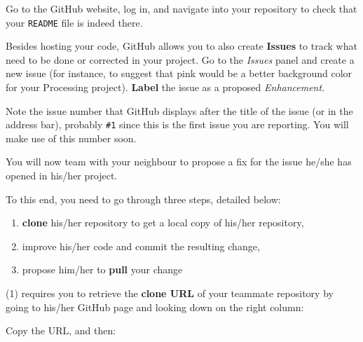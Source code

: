\documentclass{instructions}
\begin{document}

Go to the GitHub website, log in, and navigate into your repository to check that
your \texttt{README} file is indeed there.

Besides hosting your code, GitHub allows you to also create \textbf{Issues} to
track what need to be done or corrected in your project. Go to the \emph{Issues}
panel
and
create a new issue (for instance, to suggest that pink would be a better
background color for your Processing project). \textbf{Label} the issue as a
proposed \emph{Enhancement}.

Note the issue number that GitHub displays after the title of the issue (or in the address
bar), probably \texttt{\#1} since this is the first issue you are reporting. You
will make use of this number soon.


You will now team with your neighbour to propose a fix for the issue he/she has
opened in his/her project.

To this end, you need to go through three steps, detailed below:
\begin{enumerate}
    \item \textbf{clone} his/her repository to get a local copy of his/her
        repository,
    \item improve his/her code and commit the resulting change,
    \item propose him/her to \textbf{pull} your change
\end{enumerate}

(1) requires you to retrieve the \textbf{clone URL} of your teammate
repository by going to his/her GitHub page and looking down on the right column:

\begin{center}
\end{center}


Copy the URL, and then:

\end{document}

